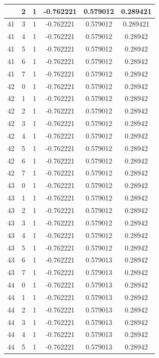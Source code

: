\documentclass[12pt,a4paper]{article}
\numberwithin{equation}{section}
\numberwithin{figure}{section}
\numberwithin{table}{section}
\begin{document}
\begin{longtable}{|c|c|c|c|c|c|}
\pagebreak
41 & 2 & 1 & -0.762221 & 0.579012 & 0.289421 \\ \hline
41 & 3 & 1 & -0.762221 & 0.579012 & 0.289421 \\ \hline
41 & 4 & 1 & -0.762221 & 0.579012 & 0.28942 \\ \hline
41 & 5 & 1 & -0.762221 & 0.579012 & 0.28942 \\ \hline
41 & 6 & 1 & -0.762221 & 0.579012 & 0.28942 \\ \hline
41 & 7 & 1 & -0.762221 & 0.579012 & 0.28942 \\ \hline
42 & 0 & 1 & -0.762221 & 0.579012 & 0.28942 \\ \hline
42 & 1 & 1 & -0.762221 & 0.579012 & 0.28942 \\ \hline
42 & 2 & 1 & -0.762221 & 0.579012 & 0.28942 \\ \hline
42 & 3 & 1 & -0.762221 & 0.579012 & 0.28942 \\ \hline
42 & 4 & 1 & -0.762221 & 0.579012 & 0.28942 \\ \hline
42 & 5 & 1 & -0.762221 & 0.579012 & 0.28942 \\ \hline
42 & 6 & 1 & -0.762221 & 0.579012 & 0.28942 \\ \hline
42 & 7 & 1 & -0.762221 & 0.579012 & 0.28942 \\ \hline
43 & 0 & 1 & -0.762221 & 0.579012 & 0.28942 \\ \hline
43 & 1 & 1 & -0.762221 & 0.579012 & 0.28942 \\ \hline
43 & 2 & 1 & -0.762221 & 0.579012 & 0.28942 \\ \hline
43 & 3 & 1 & -0.762221 & 0.579012 & 0.28942 \\ \hline
43 & 4 & 1 & -0.762221 & 0.579012 & 0.28942 \\ \hline
43 & 5 & 1 & -0.762221 & 0.579012 & 0.28942 \\ \hline
43 & 6 & 1 & -0.762221 & 0.579013 & 0.28942 \\ \hline
43 & 7 & 1 & -0.762221 & 0.579013 & 0.28942 \\ \hline
44 & 0 & 1 & -0.762221 & 0.579013 & 0.28942 \\ \hline
44 & 1 & 1 & -0.762221 & 0.579013 & 0.28942 \\ \hline
44 & 2 & 1 & -0.762221 & 0.579013 & 0.28942 \\ \hline
44 & 3 & 1 & -0.762221 & 0.579013 & 0.28942 \\ \hline
44 & 4 & 1 & -0.762221 & 0.579013 & 0.28942 \\ \hline
44 & 5 & 1 & -0.762221 & 0.579013 & 0.28942 \\ \hline

\end{longtable}
\end{document}
